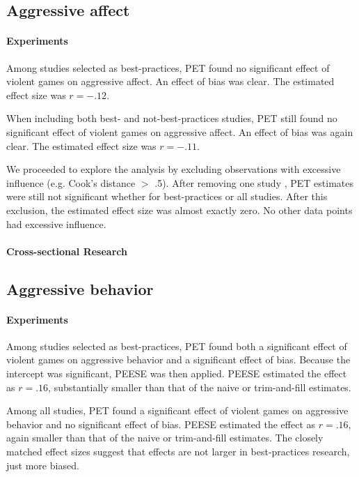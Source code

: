 \documentclass[man]{apa6}
\begin{document}
\subsection{Aggressive affect}
\paragraph{Experiments}
Among studies selected as best-practices, PET found no significant effect of violent games on aggressive affect. An effect of bias was clear. The estimated effect size was $r = -.12$.

When including both best- and not-best-practices studies, PET still found no significant effect of violent games on aggressive affect. An effect of bias was again clear. The estimated effect size was $r = -.11$.

We proceeded to explore the analysis by excluding observations with excessive influence (e.g. Cook's distance $>$ .5). After removing one study \citep{Ballard:Weist:1996}, PET estimates were still not significant whether for best-practices or all studies. After this exclusion, the estimated effect size was almost exactly zero. No other data points had excessive influence. 

\paragraph{Cross-sectional Research}

\subsection{Aggressive behavior}
\paragraph{Experiments}
Among studies selected as best-practices, PET found both a significant effect of violent games on aggressive behavior and a significant effect of bias. Because the intercept was significant, PEESE was then applied. PEESE estimated the effect as $r = .16$, substantially smaller than that of the naive or trim-and-fill estimates.

Among all studies, PET found a significant effect of violent games on aggressive behavior and no significant effect of bias. PEESE estimated the effect as $r = .16$, again smaller than that of the naive or trim-and-fill estimates. The closely matched effect sizes suggest that effects are not larger in best-practices research, just more biased.
\end{document}
